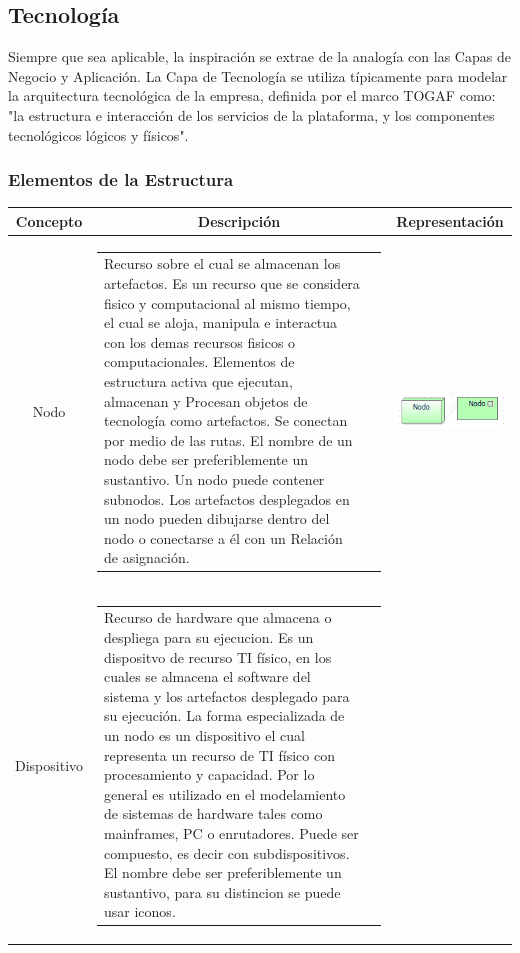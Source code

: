 \subsection{Tecnología}

Siempre que sea aplicable, la inspiración se extrae de la analogía con las Capas de Negocio y Aplicación. La Capa de Tecnología se utiliza típicamente para modelar la arquitectura tecnológica de la empresa, definida por el marco TOGAF como: "la estructura e interacción de los servicios de la plataforma, y los componentes tecnológicos lógicos y físicos".

\newpage
\subsubsection{Elementos de la Estructura}
\begin{longtable}{|c|c|c|}
	\hline
	Concepto & Descripción & Representación \\ \hline
	Nodo
	& 
	\begin{tabular}{p{8cm}p{3cm}}
		Recurso sobre el cual se almacenan los artefactos.
		Es un recurso que se considera fisico y computacional al mismo tiempo, el cual se aloja, manipula e interactua con los demas recursos fisicos o computacionales. Elementos de estructura activa que 
		ejecutan, almacenan y Procesan objetos de tecnología como artefactos. Se conectan por medio de las rutas. El nombre de un nodo debe ser preferiblemente un sustantivo. Un nodo puede contener subnodos. Los artefactos desplegados en un nodo pueden dibujarse dentro del nodo o conectarse a él con un Relación de asignación.
	\end{tabular}
	& \includegraphics[width=0.2\linewidth, height=0.05\textheight]{imgs/conceptos/tecnologica/nodo}
	\\
	\hline
	Dispositivo
	&
	\begin{tabular}{p{8cm}p{3cm}} 
		Recurso de hardware que almacena o despliega para su ejecucion. 
		Es un dispositvo de recurso TI físico, en los cuales se almacena el software del sistema y los artefactos desplegado para su ejecución.
		La forma especializada de un nodo es un dispositivo el cual representa un recurso de TI físico con procesamiento y capacidad.
		Por lo general es utilizado en el modelamiento de sistemas de hardware tales como mainframes, PC o enrutadores.
		Puede ser compuesto, es decir con subdispositivos. El nombre debe ser preferiblemente un sustantivo, para su distincion se puede usar 
		iconos.
		

\end{tabular}
\end{longtable}
